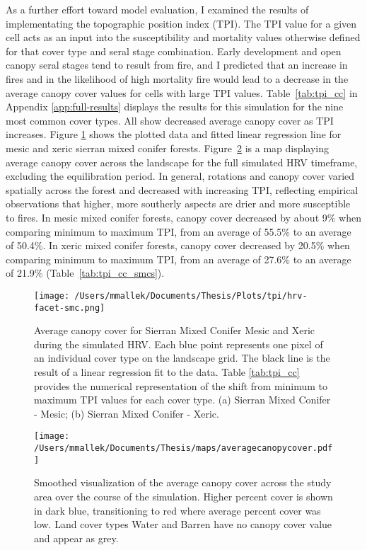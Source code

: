 As a further effort toward model evaluation, I examined the results of implementating the topographic position index (TPI). The TPI value for a given cell acts as an input into the susceptibility and mortality values otherwise defined for that cover type and seral stage combination. Early development and open canopy seral stages tend to result from fire, and I predicted that an increase in fires and in the likelihood of high mortality fire would lead to a decrease in the average canopy cover values for cells with large TPI values. Table~\ref{tab:tpi_cc} in Appendix \ref{app:full-results} displays the results for this simulation for the nine most common cover types. All show decreased average canopy cover as TPI increases. Figure \ref{fig:tpi_cc_smc} shows the plotted data and fitted linear regression line for mesic and xeric sierran mixed conifer forests. Figure~\ref{fig:averagecc} is a map displaying average canopy cover across the landscape for the full simulated HRV timeframe, excluding the equilibration period. In general, rotations and canopy cover varied spatially across the forest and decreased with increasing TPI, reflecting empirical observations that higher, more southerly aspects are drier and more susceptible to fires. In mesic mixed conifer forests, canopy cover decreased by about 9\% when comparing minimum to maximum TPI, from an average of 55.5\% to an average of 50.4\%. In xeric mixed conifer forests, canopy cover decreased by 20.5\% when comparing minimum to maximum TPI, from an average of 27.6\% to an average of 21.9\% (Table~\ref{tab:tpi_cc_smcs}).


\begin{figure}[!htbp]
\centering
\texttt{[image: /Users/mmallek/Documents/Thesis/Plots/tpi/hrv-facet-smc.png]}
\caption{Average canopy cover for Sierran Mixed Conifer Mesic and Xeric during the simulated HRV. Each blue point represents one pixel of an individual cover type on the landscape grid. The black line is the result of a linear regression fit to the data. Table \ref{tab:tpi_cc} provides the numerical representation of the shift from minimum to maximum TPI values for each cover type. (a) Sierran Mixed Conifer - Mesic; (b) Sierran Mixed Conifer - Xeric.}
\label{fig:tpi_cc_smc}
\end{figure}

\begin{figure}[!htbp]
\centering
\texttt{[image: /Users/mmallek/Documents/Thesis/maps/averagecanopycover.pdf]}
\caption{Smoothed visualization of the average canopy cover across the study area over the course of the simulation. Higher percent cover is shown in dark blue, transitioning to red where average percent cover was low. Land cover types Water and Barren have no canopy cover value and appear as grey.}
\label{fig:averagecc}
\end{figure}

